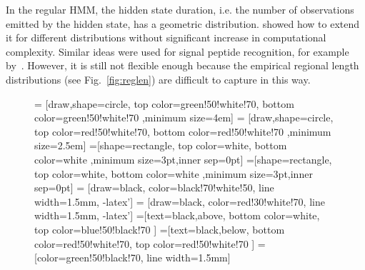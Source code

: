 \documentclass[10pt,letterpaper]{article}
\begin{document}
In the regular HMM, the hidden state duration, i.e. the number of observations emitted by the hidden state, has a geometric distribution. \cite{Durbin98biologicalsequence} showed how to extend it for different distributions without significant increase in computational 
complexity. Similar ideas were used for signal peptide recognition, for example by~\cite{2004klla}. 
However, it is still not flexible enough because the empirical regional length distributions (see Fig.~\ref{fig:reglen})
are difficult to capture in this way.

\begin{figure}[h]
\centering
{} = [draw,shape=circle, top color=green!50!white!70, bottom color=green!50!white!70 ,minimum size=4em]
 = [draw,shape=circle, top color=red!50!white!70, bottom color=red!50!white!70 ,minimum size=2.5em]
\def\radius{.7mm} 
=[shape=rectangle, top color=white, bottom color=white ,minimum size=3pt,inner sep=0pt]
=[shape=rectangle, top color=white, bottom color=white ,minimum size=3pt,inner sep=0pt]
\def\n{11}
  = [draw=black, color=black!70!white!50, line width=1.5mm, -latex'] 
  = [draw=black, color=red!30!white!70, line width=1.5mm, -latex']
=[text=black,above, bottom color=white, top color=blue!50!black!70  ]
=[text=black,below, bottom color=red!50!white!70, top color=red!50!white!70  ]
  = [color=green!50!black!70, line width=1.5mm]
\def\names{{"$O_{1,1}$","...","$O_{1,d_1}$", "...","$O_{k, 1}$", "...", "$O_{k, d_k}$"}}%
\end{figure}
\end{document}
